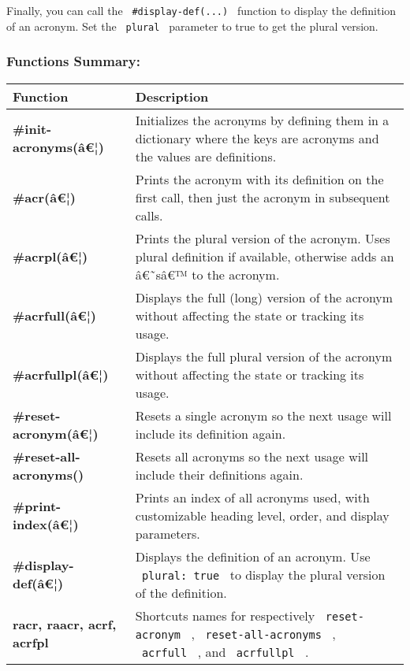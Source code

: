 Finally, you can call the \texttt{\ \#display-def(...)\ } function to
display the definition of an acronym. Set the \texttt{\ plural\ }
parameter to true to get the plural version.

\subsubsection{Functions Summary:}\label{functions-summary}

\begin{longtable}[]{@{}ll@{}}
\toprule\noalign{}
\textbf{Function} & \textbf{Description} \\
\midrule\noalign{}
\endhead
\bottomrule\noalign{}
\endlastfoot
\textbf{\#init-acronyms(â€¦)} & Initializes the acronyms by defining
them in a dictionary where the keys are acronyms and the values are
definitions. \\
\textbf{\#acr(â€¦)} & Prints the acronym with its definition on the
first call, then just the acronym in subsequent calls. \\
\textbf{\#acrpl(â€¦)} & Prints the plural version of the acronym. Uses
plural definition if available, otherwise adds an â€˜sâ€™ to the
acronym. \\
\textbf{\#acrfull(â€¦)} & Displays the full (long) version of the
acronym without affecting the state or tracking its usage. \\
\textbf{\#acrfullpl(â€¦)} & Displays the full plural version of the
acronym without affecting the state or tracking its usage. \\
\textbf{\#reset-acronym(â€¦)} & Resets a single acronym so the next
usage will include its definition again. \\
\textbf{\#reset-all-acronyms()} & Resets all acronyms so the next usage
will include their definitions again. \\
\textbf{\#print-index(â€¦)} & Prints an index of all acronyms used, with
customizable heading level, order, and display parameters. \\
\textbf{\#display-def(â€¦)} & Displays the definition of an acronym. Use
\texttt{\ plural:\ true\ } to display the plural version of the
definition. \\
\textbf{racr, raacr, acrf, acrfpl} & Shortcuts names for respectively
\texttt{\ reset-acronym\ } , \texttt{\ reset-all-acronyms\ } ,
\texttt{\ acrfull\ } , and \texttt{\ acrfullpl\ } . \\
\end{longtable}

